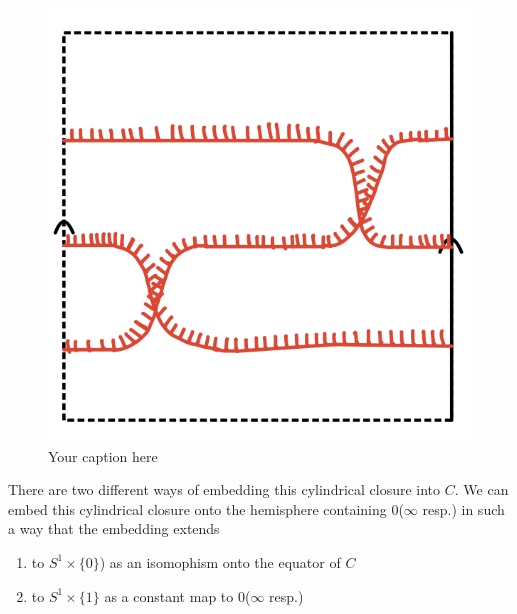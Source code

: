 \begin{figure}[H] %
    \centering
    \includegraphics[scale = 0.95]{diagrams/natural_alternating_diagrams/3.png} %
    \caption{Your caption here}
    \label{fig:your-label}
\end{figure}

There are two different ways of embedding this cylindrical closure into $C$. We can embed this cylindrical closure onto the hemisphere containing $0$($\infty$ resp.) in such a way that the embedding extends
\begin{enumerate}[label = (roman*)]
\item to $S^1 \times \{ 0 \}$) as an isomophism onto the equator of $C$
\item to  $S^1 \times \{ 1 \}$ as a constant map to $0$($\infty$ resp.)
\end{enumerate}

